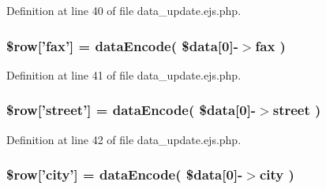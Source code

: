 \-Definition at line 40 of file data\-\_\-update.\-ejs.\-php.

\hypertarget{patientfile_2immnunization_2data__update_8ejs_8php_addcf6434ea14720a2fb19d21dc55a8c9}{
\subsubsection[{\$row}]{\setlength{\rightskip}{0pt plus 5cm}\$row\mbox{[}'fax'\mbox{]} = {\bf data\-Encode}( \$data\mbox{[}0\mbox{]}-\/$>$fax )}}\label{patientfile_2immnunization_2data__update_8ejs_8php_addcf6434ea14720a2fb19d21dc55a8c9}


\-Definition at line 41 of file data\-\_\-update.\-ejs.\-php.

\hypertarget{patientfile_2immnunization_2data__update_8ejs_8php_a7333deeacbe82dc6e01b7e9e86eb3e5a}{
\subsubsection[{\$row}]{\setlength{\rightskip}{0pt plus 5cm}\$row\mbox{[}'street'\mbox{]} = {\bf data\-Encode}( \$data\mbox{[}0\mbox{]}-\/$>$street )}}\label{patientfile_2immnunization_2data__update_8ejs_8php_a7333deeacbe82dc6e01b7e9e86eb3e5a}


\-Definition at line 42 of file data\-\_\-update.\-ejs.\-php.

\hypertarget{patientfile_2immnunization_2data__update_8ejs_8php_abc2948b74989328277b5513f9ba22e4e}{
\subsubsection[{\$row}]{\setlength{\rightskip}{0pt plus 5cm}\$row\mbox{[}'city'\mbox{]} = {\bf data\-Encode}( \$data\mbox{[}0\mbox{]}-\/$>$city )}}\label{patientfile_2immnunization_2data__update_8ejs_8php_abc2948b74989328277b5513f9ba22e4e}


